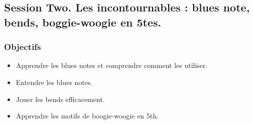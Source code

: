 \documentclass[a4paper]{book}
\begin{document}
\subsection{Session Two. Les incontournables : blues note, bends, boggie-woogie en 5tes.}
\subsubsection{Objectifs}
\begin{itemize}
\item Apprendre les blues notes et comprendre comment les utiliser.
\item Entendre les blues notes.
\item Jouer les bends efficacement.
\item Apprendre les motifs de boogie-woogie en 5th.
\end{itemize}
\end{document}
